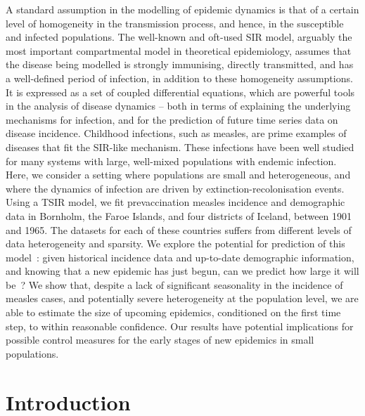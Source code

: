 \documentclass[10pt]{article}
\begin{document}
A standard assumption in the modelling of epidemic dynamics is that of a certain level of homogeneity in the transmission process, and hence, in the susceptible and infected populations. The well-known and oft-used SIR model, arguably the most important compartmental model in theoretical epidemiology, assumes that the disease being modelled is strongly immunising, directly transmitted, and has a well-defined period of infection, in addition to these homogeneity assumptions. It is expressed as a set of coupled differential equations, which are powerful tools in the analysis of disease dynamics -- both in terms of explaining the underlying mechanisms for infection, and for the prediction of future time series data on disease incidence. Childhood infections, such as measles, are prime examples of diseases that fit the SIR-like mechanism. These infections have been well studied for many systems with large, well-mixed populations with endemic infection. Here, we consider a setting where populations are small and heterogeneous, and where the dynamics of infection are driven by extinction-recolonisation events. Using a TSIR model, we fit prevaccination measles incidence and demographic data in Bornholm, the Faroe Islands, and four districts of Iceland, between 1901 and 1965. The datasets for each of these countries suffers from different levels of data heterogeneity and sparsity. We explore the potential for prediction of this model~: given historical incidence data and up-to-date demographic information, and knowing that a new epidemic has just begun, can we predict how large it will be~? We show that, despite a lack of significant seasonality in the incidence of measles cases, and potentially severe heterogeneity at the population level, we are able to estimate the size of upcoming epidemics, conditioned on the first time step, to within reasonable confidence. Our results have potential implications for possible control measures for the early stages of new epidemics in small populations.















\section*{Introduction}
\end{document}
